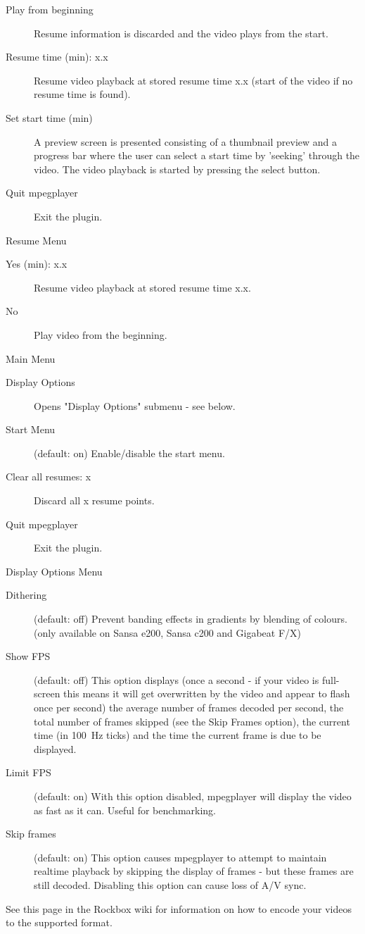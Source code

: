 \begin{description}
\item[Play from beginning] Resume information is discarded and the video plays
    from the start.
\item[Resume time (min): x.x] Resume video playback at stored resume time x.x
    (start of the video if no resume time is found).
\item[Set start time (min)] A preview screen is presented consisting of a
    thumbnail preview and a progress bar where the user can select a start time
    by 'seeking' through the video. The video playback is started by pressing
    the select button.
\item[Quit mpegplayer] Exit the plugin.
\end{description}

Resume Menu

\begin{description}
\item[Yes (min): x.x] Resume video playback at stored resume time x.x.
\item[No] Play video from the beginning.
\end{description}

Main Menu

\begin{description}
\item[Display Options] Opens "Display Options" submenu - see below.
\item[Start Menu] (default: on) Enable/disable the start menu.
\item[Clear all resumes: x] Discard all x resume points.
\item[Quit mpegplayer] Exit the plugin.
\end{description}

Display Options Menu

\begin{description}
\item[Dithering] (default: off) Prevent banding effects in gradients by blending
    of colours. (only available on Sansa e200, Sansa c200 and Gigabeat F/X)
\item[Show FPS] (default: off) This option displays (once a second - if your
    video is full-screen this means it will get overwritten by the video and
    appear to flash once per second) the average number of frames decoded per
    second, the total number of frames skipped (see the Skip Frames option),
    the current time (in 100~Hz ticks) and the time the current frame is due to
    be displayed.
\item[Limit FPS] (default: on) With this option disabled, mpegplayer will
    display the video as fast as it can. Useful for benchmarking.
\item[Skip frames] (default: on) This option causes mpegplayer to attempt to
    maintain realtime playback by skipping the display of frames - but these
    frames are still decoded. Disabling this option can cause loss of A/V sync. 
\end{description}

See this page in the Rockbox wiki for information on how to encode your videos
to the supported format. 
